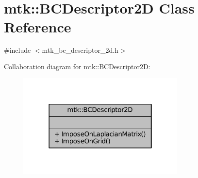 \hypertarget{classmtk_1_1BCDescriptor2D}{\section{mtk\+:\+:B\+C\+Descriptor2\+D Class Reference}
\label{classmtk_1_1BCDescriptor2D}
}


{\ttfamily \#include $<$mtk\+\_\+bc\+\_\+descriptor\+\_\+2d.\+h$>$}



Collaboration diagram for mtk\+:\+:B\+C\+Descriptor2\+D\+:
\nopagebreak
\begin{figure}[H]
\begin{center}
\leavevmode
\includegraphics[width=238pt]{classmtk_1_1BCDescriptor2D__coll__graph}
\end{center}
\end{figure}
